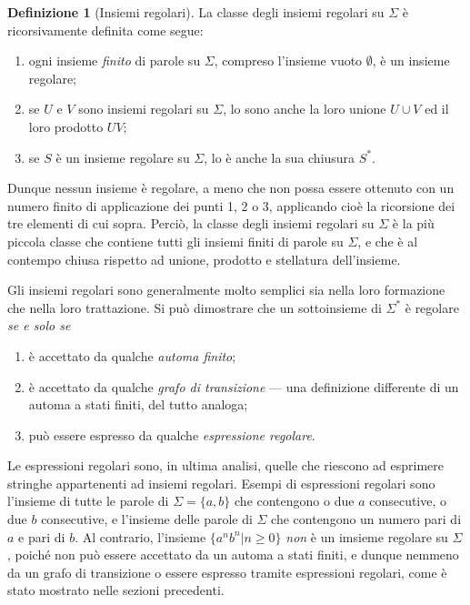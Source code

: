 \documentclass[10pt]{\classname}
\theoremstyle{definition}
\newtheorem{definizione}{Definizione}[section]
\theoremstyle{definition}
\theoremstyle{definition}
\theoremstyle{definition}
\begin{document}
\begin{definizione}[Insiemi regolari]\label{def:insiemi-regolari}
    La classe degli insiemi regolari su $\Sigma$ è ricorsivamente definita come segue:
    \begin{enumerate}
        \item ogni insieme \emph{finito} di parole su $\Sigma$, compreso l'insieme
            vuoto $\emptyset$, è un insieme regolare;
        \item se $U$ e $V$ sono insiemi regolari su $\Sigma$, lo sono anche la loro
            unione $U\cup V$ ed il loro prodotto $UV$;
        \item se $S$ è un insieme regolare su $\Sigma$, lo è anche la sua chiusura
            $S^*$.
    \end{enumerate}
\end{definizione}

Dunque nessun insieme è regolare, a meno che non possa essere ottenuto con un
numero finito di applicazione dei punti 1, 2 o 3, applicando cioè la ricorsione dei tre elementi di cui sopra. Perciò, la classe degli
insiemi regolari su $\Sigma$ è la più piccola classe che contiene tutti gli
insiemi finiti di parole su $\Sigma$, e che è al contempo chiusa rispetto ad
unione, prodotto e stellatura dell'insieme.

Gli insiemi regolari sono generalmente molto semplici sia nella loro formazione che nella loro trattazione. Si può dimostrare che un sottoinsieme di
$\Sigma^*$ è regolare \emph{se e solo se}

\begin{enumerate}
    \item è accettato da qualche \emph{automa finito};
    \item è accettato da qualche \emph{grafo di transizione} --- una
        definizione differente di un automa a stati finiti, del tutto analoga;
    \item può essere espresso da qualche \emph{espressione regolare}.
\end{enumerate}

Le espressioni regolari sono, in ultima analisi, quelle che riescono ad
esprimere stringhe appartenenti ad insiemi regolari. Esempi di espressioni
regolari sono l'insieme di tutte le parole di $\Sigma = \{a, b\}$ che
contengono o due $a$ consecutive, o due $b$ consecutive, e l'insieme delle
parole di $\Sigma$ che contengono un numero pari di $a$ e pari di $b$. Al
contrario, l'insieme $\{a^n b^n| n\geq 0\}$ \emph{non} è un imsieme regolare su
$\Sigma$, poiché non può essere accettato da un automa a stati finiti, e dunque nemmeno da un grafo di transizione o essere espresso tramite espressioni regolari, come è stato mostrato nelle sezioni precedenti.
\end{document}
